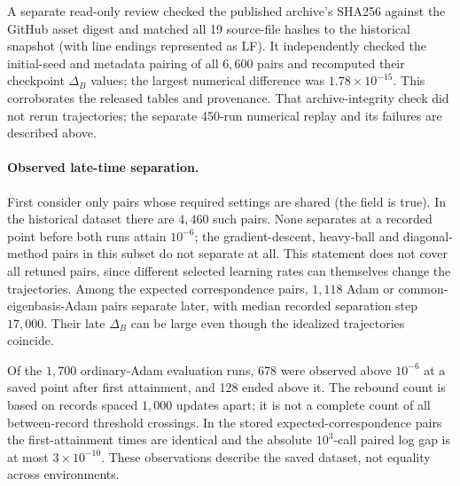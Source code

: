 \documentclass[11pt,a4paper]{article}
\begin{document}
A separate read-only review checked the published archive's SHA256 against
the GitHub asset digest and matched all 19 source-file hashes to the historical
snapshot (with line endings represented as LF). It independently checked
the initial-seed and metadata pairing of all $6{,}600$ pairs and recomputed
their checkpoint $\Delta_B$ values; the largest numerical difference was
$1.78\times10^{-15}$. This corroborates the released tables and provenance.
That archive-integrity check did not rerun trajectories; the separate
450-run numerical replay and its failures are described above.

\paragraph{Observed late-time separation.} First consider only pairs whose
required settings are shared (the field  is true).
In the historical dataset there are $4{,}460$ such pairs. None separates at a
recorded point before both runs attain $10^{-6}$; the gradient-descent,
heavy-ball and diagonal-method pairs in this subset do not separate at all.
This statement does not cover all retuned pairs, since different selected
learning rates can themselves change the trajectories. Among the expected
correspondence pairs, $1{,}118$ Adam or common-eigenbasis-Adam pairs separate
later, with median recorded separation step $17{,}000$. Their late
$\Delta_B$ can be large even though the idealized trajectories coincide.

Of the $1{,}700$ ordinary-Adam evaluation runs, 678 were observed above
$10^{-6}$ at a saved point after first attainment, and 128 ended above it.
The rebound count is based on records spaced $1{,}000$ updates apart; it is
not a complete count of all between-record threshold crossings. In the
stored expected-correspondence pairs the first-attainment times are identical and
the absolute $10^3$-call paired log gap is at most $3\times10^{-10}$.
These observations describe the saved dataset, not equality across environments.
\end{document}
